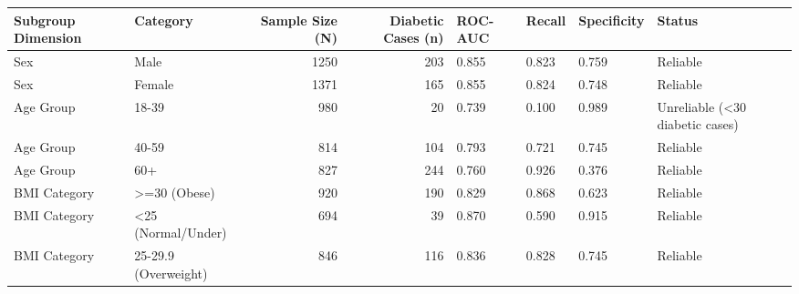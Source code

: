 \begin{tabular}{llrrllll}
\toprule
Subgroup Dimension & Category & Sample Size (N) & Diabetic Cases (n) & ROC-AUC & Recall & Specificity & Status \\
\midrule
Sex & Male & 1250 & 203 & 0.855 & 0.823 & 0.759 & Reliable \\
Sex & Female & 1371 & 165 & 0.855 & 0.824 & 0.748 & Reliable \\
Age Group & 18-39 & 980 & 20 & 0.739 & 0.100 & 0.989 & Unreliable (<30 diabetic cases) \\
Age Group & 40-59 & 814 & 104 & 0.793 & 0.721 & 0.745 & Reliable \\
Age Group & 60+ & 827 & 244 & 0.760 & 0.926 & 0.376 & Reliable \\
BMI Category & >=30 (Obese) & 920 & 190 & 0.829 & 0.868 & 0.623 & Reliable \\
BMI Category & <25 (Normal/Under) & 694 & 39 & 0.870 & 0.590 & 0.915 & Reliable \\
BMI Category & 25-29.9 (Overweight) & 846 & 116 & 0.836 & 0.828 & 0.745 & Reliable \\
\bottomrule
\end{tabular}
